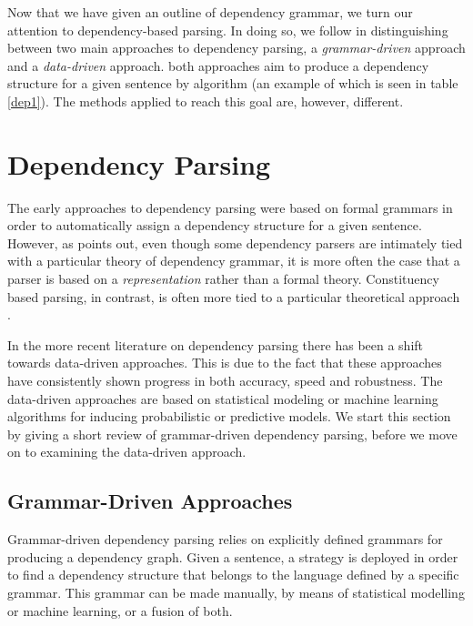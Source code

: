 Now that we have given an outline of dependency grammar, we turn our attention to dependency-based parsing. In doing so, we follow  in distinguishing between two main approaches to dependency parsing, a \textit{grammar-driven} approach and a \textit{data-driven} approach. both approaches aim to produce a dependency structure for a given sentence by algorithm (an example of which is seen in table \ref{dep1}). The methods applied to reach this goal are, however, different.

\section{Dependency Parsing}
\label{parsing}

The early approaches to dependency parsing were based on formal grammars in order to automatically assign a dependency structure for a given sentence. However, as \citeauthor{Niv:05} points out, even though some dependency parsers are intimately tied with a particular theory of dependency grammar, it is more often the case that a parser is based on a \textit{representation} rather than a formal theory. Constituency based parsing, in contrast, is often more tied to a particular theoretical approach \cite{Niv:05}.


In the more recent literature on dependency parsing there has been a shift towards data-driven approaches. This is due to the fact that these approaches have consistently shown progress in both accuracy, speed and robustness. The data-driven approaches are based on statistical modeling or machine learning algorithms for inducing probabilistic or predictive models. We start this section by giving a short review of grammar-driven dependency parsing, before we move on to examining the data-driven approach.

\subsection{Grammar-Driven Approaches}
\label{grammar-driven}

Grammar-driven dependency parsing relies on explicitly defined grammars for producing a dependency graph. Given a sentence, a strategy is deployed in order to find a dependency structure that belongs to the language defined by a specific grammar. This grammar can be made manually, by means of statistical modelling or machine learning, or a fusion of both.

